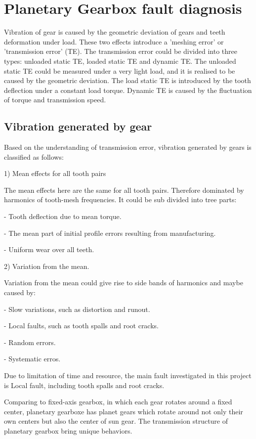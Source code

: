 \section{Planetary Gearbox fault diagnosis}

Vibration of gear is caused by the geometric deviation of gears and teeth deformation under load. These two effects introduce a 'meshing error' or 'transmission error' (TE). \cite{VBCM}The transmission error could be divided into three types: unloaded static TE, loaded static TE and dynamic TE. The unloaded static TE could be measured under a very light load, and it is realised to be caused by the geometric deviation. The load static TE is introduced by the tooth deflection under a constant load torque. Dynamic TE is caused by the fluctuation of torque and transmission speed.


\subsection{Vibration generated by gear}

Based on the understanding of transmission error, vibration generated by gears is classified as follows: \cite{VBCM}

1) Mean effects for all tooth pairs

The mean effects here are the same for all tooth pairs. Therefore dominated by harmonics of tooth-mesh frequencies. It could be sub divided into tree parts: 

	- Tooth deflection due to mean torque.
		
	- The mean part of initial profile errors resulting from manufacturing.	
	
	- Uniform wear over all teeth.

2) Variation from the mean.

Variation from the mean could give rise to side bands of harmonics and maybe caused by:

	- Slow variations, such as distortion and runout.	
	
	- Local faults, such as tooth spalls and root cracks.	
	
	- Random errors.	
	
	- Systematic erros.

Due to limitation of time and resource, the main fault investigated in this project is Local fault, including tooth spalls and root cracks.

Comparing to fixed-axis gearbox, in which each gear rotates around a fixed center, planetary gearboxe has planet gears which rotate around not only their own centers but also the center of sun gear. The transmission structure of planetary gearbox bring unique behaviors. \cite{review}


